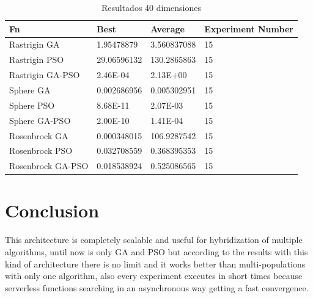 \documentclass[runningheads]{llncs}
\begin{document}

            \begin{table}[htp]
              \caption{Resultados 40 dimensiones}
              \label{table:resultados-2}
              \centering
              \begin{tabular}{|l|l|l|l|}
              \hline
              Fn & Best & Average & Experiment Number \\
              \hline
              \hline
              Rastrigin GA & 1.95478879 & 3.560837088 & 15\\
              \hline
              Rastrigin PSO & 29.06596132 & 130.2865863 & 15\\
              \hline
              Rastrigin GA-PSO & 2.46E-04 & 2.13E+00 & 15\\
              \hline
              Sphere GA & 0.002686956 & 0.005302951 & 15\\
              \hline
              Sphere PSO & 8.68E-11 & 2.07E-03 & 15\\
              \hline
              Sphere GA-PSO & 2.00E-10 & 1.41E-04 & 15\\
              \hline
              Rosenbrock GA & 0.000348015 & 106.9287542 & 15\\
              \hline
              Rosenbrock PSO & 0.032708559 & 0.368395353 & 15\\
              \hline
              Rosenbrock GA-PSO & 0.018538924 & 0.525086565 & 15\\
              \hline
              \end{tabular}
              \end{table}
%
%
% 
% 
%
\section{Conclusion}

This architecture is completely scalable and useful for hybridization of
multiple algorithms, until now is only GA and PSO but according to the results
with this kind of architecture there is no limit and it works better than
multi-populations with only one algorithm, also every experiment executes in
short times because serverless functions searching in an asynchronous way
getting a fast convergence.
\end{document}
